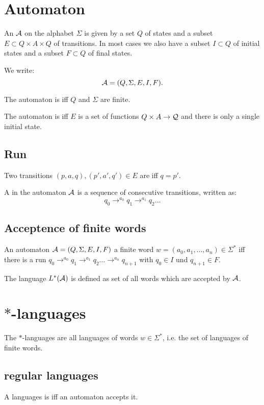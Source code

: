 

\section{Automaton}

An  $\mathcal{A}$ on the alphabet $\Sigma$ is given by a set $Q$ of states and a subset $E \subset Q \times A \times Q$ of transitions. In most cases we also have a subset $I \subset Q$ of initial states and a subset $F \subset Q$ of final states.

We write:
\[ \mathcal{A} = (Q, \Sigma, E, I, F). \]

The automaton is  iff $Q$ and $\Sigma$ are finite.

The automaton is  iff $E$ is a set of functions $Q \times A \rightarrow \mathcal{Q}$ and there is only a single initial state.

\subsection{Run}
Two transitions $(p,a,q), (p',a',q') \in E$ are  iff $q=p'$.

A  in the automaton $\mathcal{A}$ is a sequence of consecutive transitions, written as:
\[ q_0 \rightarrow^{a_0} q_1 \rightarrow^{a_1} q_2 \dots \]

\subsection{Acceptence of finite words}

An automaton $\mathcal{A} = (Q, \Sigma, E, I, F)$  a finite word $w = (a_0,a_1,...,a_n) \in \Sigma^*$ iff there is a run $q_0 \rightarrow^{a_0} q_1 \rightarrow^{a_1} q_2 \dots \rightarrow^{a_n} q_{n+1}$ with $q_0 \in I$ und $q_{n+1} \in F$.

The language $L^*(\mathcal{A})$ is defined as set of all words which are accepted by $\mathcal{A}$.

\section{$*$-languages}
The $*$-languages are all languages of words $w \in \Sigma^*$, i.e. the set of languages of finite words.

\subsection{regular languages}
A languages is  iff an automaton accepts it.

